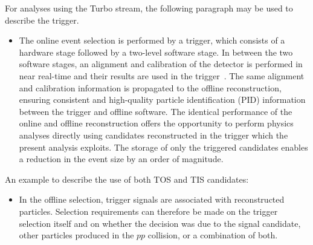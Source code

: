 \begin{itemize}
\end{itemize}

For analyses using the Turbo stream, the following paragraph may 
be used to describe the trigger.
\begin{itemize}
\item  The online event selection is performed by a trigger, which consists of a hardware stage followed by a two-level software stage. In between the two software stages, an alignment and calibration of the detector is performed in near real-time and their results are used in the trigger~\cite{LHCb-PROC-2015-011}.
      The same alignment and calibration information is propagated 
      to the offline reconstruction, ensuring consistent and high-quality 
      particle identification (PID) information between the trigger and 
      offline software. The identical performance of the online and offline 
      reconstruction offers the opportunity to perform physics analyses 
      directly using candidates reconstructed in the trigger 
      \cite{LHCb-DP-2012-004,LHCb-DP-2016-001} 
      which the present analysis exploits. The storage of only the triggered
      candidates enables a reduction in the event size by an order 
      of magnitude.
\end{itemize}

An example to describe the use of both TOS and TIS candidates:
\begin{itemize}
\item In the offline selection, trigger signals are associated with reconstructed particles.
Selection requirements can therefore be made on the trigger selection itself
and on whether the decision was due to the signal candidate, other particles produced in the $pp$ collision, or a combination of both.
\end{itemize}

